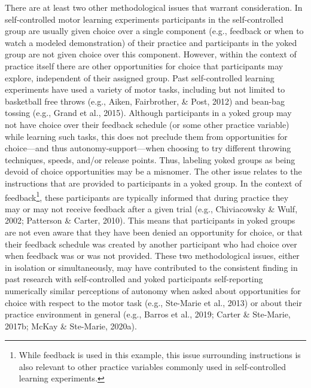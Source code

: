 \documentclass[
  english,
  man, donotrepeattitle,floatsintext]{apa7}
\begin{document}
There are at least two other methodological issues that warrant consideration. In self-controlled motor learning experiments participants in the self-controlled group are usually given choice over a single component (e.g., feedback or when to watch a modeled demonstration) of their practice and participants in the yoked group are not given choice over this component. However, within the context of practice itself there are other opportunities for choice that participants may explore, independent of their assigned group. Past self-controlled learning experiments have used a variety of motor tasks, including but not limited to basketball free throws (e.g., Aiken, Fairbrother, \& Post, 2012) and bean-bag tossing (e.g., Grand et al., 2015). Although participants in a yoked group may not have choice over their feedback schedule (or some other practice variable) while learning such tasks, this does not preclude them from opportunities for choice---and thus autonomy-support---when choosing to try different throwing techniques, speeds, and/or release points. Thus, labeling yoked groups as being devoid of choice opportunities may be a misnomer. The other issue relates to the instructions that are provided to participants in a yoked group. In the context of feedback\footnote{While feedback is used in this example, this issue surrounding instructions is also relevant to other practice variables commonly used in self-controlled learning experiments.}, these participants are typically informed that during practice they may or may not receive feedback after a given trial (e.g., Chiviacowsky \& Wulf, 2002; Patterson \& Carter, 2010). This means that participants in yoked groups are not even aware that they have been denied an opportunity for choice, or that their feedback schedule was created by another participant who had choice over when feedback was or was not provided. These two methodological issues, either in isolation or simultaneously, may have contributed to the consistent finding in past research with self-controlled and yoked participants self-reporting numerically similar perceptions of autonomy when asked about opportunities for choice with respect to the motor task (e.g., Ste-Marie et al., 2013) or about their practice environment in general (e.g., Barros et al., 2019; Carter \& Ste-Marie, 2017b; McKay \& Ste-Marie, 2020a).
\end{document}
